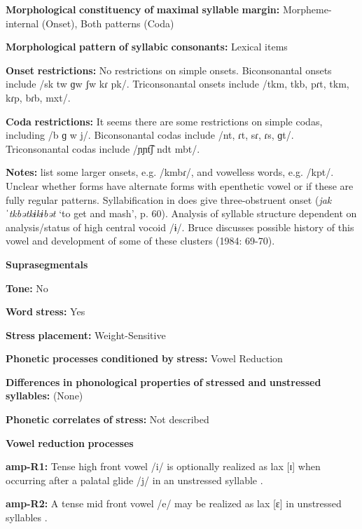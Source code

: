 \textbf{Morphological} \textbf{constituency} \textbf{of} \textbf{maximal} \textbf{syllable} \textbf{margin:} Morpheme-internal (Onset), Both patterns (Coda)

\textbf{Morphological} \textbf{pattern} \textbf{of} \textbf{syllabic} \textbf{consonants:} Lexical items

\textbf{Onset} \textbf{restrictions:} No restrictions on simple onsets. Biconsonantal onsets include /sk tw ɡw ʃw kɾ pk/. Triconsonantal onsets include /tkm, tkb, pɾt, tkm, kɾp, bɾb, mxt/.

\textbf{Coda} \textbf{restrictions:} It seems there are some restrictions on simple codas, including /b ɡ w j/. Biconsonantal codas include /nt, ɾt, sɾ, ɾs, ɡt/. Triconsonantal codas include /ɲɲt͡ʃ ndt mbt/.

\textbf{Notes:} \citet{EdmistonEdmiston2003} list some larger onsets, e.g. /kmbɾ/, and vowelless words, e.g. /kpt/. Unclear whether forms have alternate forms with epenthetic vowel or if these are fully regular patterns. Syllabification in \citet{Bruce1984} does give three-obstruent onset (\textit{jakˈtkbətkɨkɨbət} ‘to get and mash’, p. 60). Analysis of syllable structure dependent on analysis/status of high central vocoid /ɨ/. Bruce discusses possible history of this vowel and development of some of these clusters (1984: 69-70).

\textbf{Suprasegmentals}

\textbf{Tone:} No

\textbf{Word} \textbf{stress:} Yes

\textbf{Stress} \textbf{placement:} Weight-Sensitive

\textbf{Phonetic} \textbf{processes} \textbf{conditioned} \textbf{by} \textbf{stress:} Vowel Reduction

\textbf{Differences} \textbf{in} \textbf{phonological} \textbf{properties} \textbf{of} \textbf{stressed} \textbf{and} \textbf{unstressed} \textbf{syllables:} (None)

\textbf{Phonetic} \textbf{correlates} \textbf{of} \textbf{stress:} Not described

\textbf{Vowel} \textbf{reduction} \textbf{processes}

\textbf{amp-R1:} Tense high front vowel /i/ is optionally realized as lax [ɪ] when occurring after a palatal glide /j/ in an unstressed syllable \citep[37]{Bruce1984}.

\textbf{amp-R2:} A tense mid front vowel /e/ may be realized as lax [ɛ] in unstressed syllables \citep[38]{Bruce1984}.

